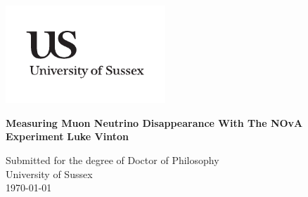 \documentclass[a4paper,11pt]{report}
\newcommand{\linespacing}{1.5}
\renewcommand{\baselinestretch}{\linespacing}
\begin{document}




\thispagestyle{empty}
\begin{flushright}
\includegraphics[width=6cm]{img/uslogo.pdf}
\end{flushright}	
\vskip40mm
\begin{center}
\huge\textbf{Measuring Muon Neutrino Disappearance With The NOvA Experiment}
\vskip2mm
\Large\textbf{Luke Vinton}
\normalsize
\end{center}
\vfill
\begin{flushleft}
\large
Submitted for the degree of Doctor of Philosophy \\
University of Sussex	\\
\today
\end{flushleft}		
%
%
	

%
%
\end{document}
